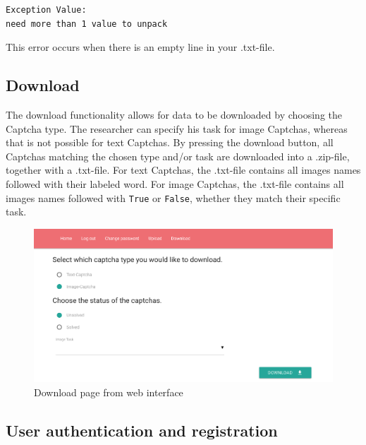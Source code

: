 \begin{verbatim}
Exception Value:
need more than 1 value to unpack
\end{verbatim}
This error occurs when there is an empty line in your .txt-file.

\clearpage
\subsection{Download}

The download functionality allows for data to be downloaded by choosing the Captcha type. The researcher can specify his task for image Captchas, whereas that is not possible for text Captchas. By pressing the download button, all Captchas matching the chosen type and/or task are downloaded into a .zip-file, together with a .txt-file. For text Captchas, the .txt-file contains all images names followed with their labeled word. For image Captchas, the .txt-file contains all images names followed with \verb|True| or \verb|False|, whether they match their specific task.
\begin{figure}[H]
\centering
\includegraphics[width=1\linewidth]{content/figures/download.png}
\caption{Download page from web interface}
\label{fig:download}
\end{figure}

\subsection{User authentication and registration}

